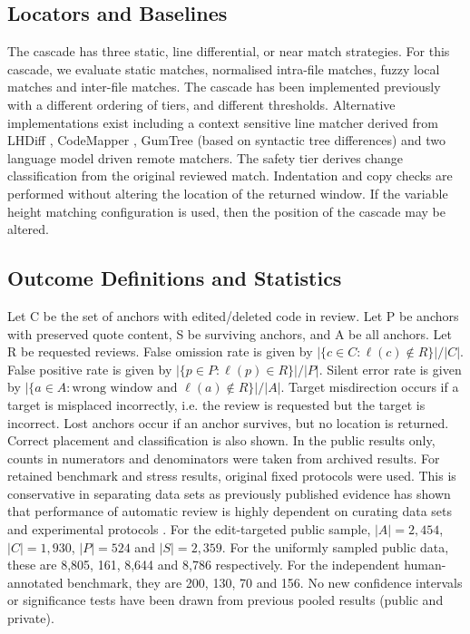 \documentclass[10pt,conference,letterpaper]{IEEEtran}
\begin{document}
\subsection{Locators and Baselines}
The cascade has three static, line differential, or near match strategies. For this cascade, we evaluate static matches, normalised intra-file matches, fuzzy local matches and inter-file matches. The cascade has been implemented previously with a different ordering of tiers, and different thresholds. Alternative implementations exist including a context sensitive line matcher derived from LHDiff \cite{lhdiff2013}, CodeMapper \cite{codemapper2026}, GumTree \cite{gumtree2014} (based on syntactic tree differences) and two language model driven remote matchers. The safety tier derives change classification from the original reviewed match. Indentation and copy checks are performed without altering the location of the returned window. If the variable height matching configuration is used, then the position of the cascade may be altered.

\subsection{Outcome Definitions and Statistics}
Let C be the set of anchors with edited/deleted code in review. Let P be anchors with preserved quote content, S be surviving anchors, and A be all anchors. Let R be requested reviews. False omission rate is given by $|\{c\in C:\ell(c)\notin R\}|/|C|$. False positive rate is given by $|\{p\in P:\ell(p)\in R\}|/|P|$. Silent error rate is given by $|\{a\in A:\text{wrong window and }\ell(a)\notin R\}|/|A|$. Target misdirection occurs if a target is misplaced incorrectly, i.e. the review is requested but the target is incorrect. Lost anchors occur if an anchor survives, but no location is returned. Correct placement and classification is also shown. In the public results only, counts in numerators and denominators were taken from archived results. For retained benchmark and stress results, original fixed protocols were used. This is conservative in separating data sets as previously published evidence has shown that performance of automatic review is highly dependent on curating data sets and experimental protocols \cite{tufano2024,pirouzkhah2026}. For the edit-targeted public sample, $|A|=2,454$, $|C|=1,930$, $|P|=524$ and $|S|=2,359$. For the uniformly sampled public data, these are 8,805, 161, 8,644 and 8,786 respectively. For the independent human-annotated benchmark, they are 200, 130, 70 and 156. No new confidence intervals or significance tests have been drawn from previous pooled results (public and private).
\end{document}
